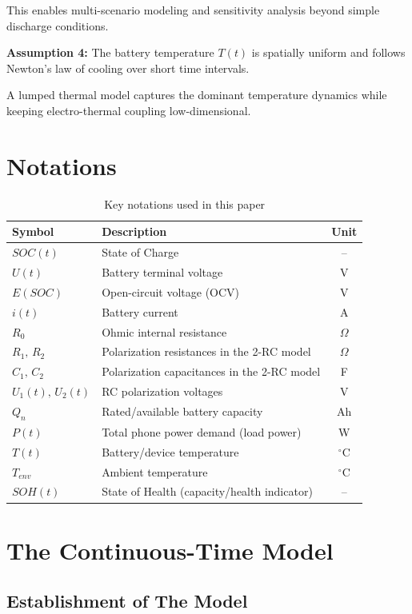 \documentclass{mcmthesis}
\begin{document}
This enables multi-scenario modeling and sensitivity analysis beyond simple discharge conditions.

\textbf{Assumption 4:}
The battery temperature $T(t)$ is spatially uniform and follows Newton’s law of cooling over short time intervals.

A lumped thermal model captures the dominant temperature dynamics while keeping electro-thermal coupling low-dimensional.
\section{Notations}

\begin{table}[H]
\centering
\caption{Key notations used in this paper}
\vspace{-0.4cm}
\begin{tabularx}{0.92\textwidth}{lXc}
\toprule
Symbol & Description & Unit \\
\midrule
$SOC(t)$ & State of Charge  & -- \\
$U(t)$ & Battery terminal voltage & V \\
$E(SOC)$ & Open-circuit voltage (OCV)  & V \\
$i(t)$ & Battery current & A \\
$R_0$ & Ohmic internal resistance & $\Omega$ \\
$R_1,\,R_2$ & Polarization resistances in the 2-RC model & $\Omega$ \\
$C_1,\,C_2$ & Polarization capacitances in the 2-RC model & F \\
$U_1(t),\,U_2(t)$ & RC polarization voltages & V \\
$Q_n$ & Rated/available battery capacity & Ah \\
$P(t)$ & Total phone power demand (load power) & W \\
$T(t)$ & Battery/device temperature & $^\circ$C \\
$T_{env}$ & Ambient temperature & $^\circ$C \\
$SOH(t)$ & State of Health (capacity/health indicator) & -- \\
\bottomrule
\end{tabularx}
\end{table}
\section{The Continuous-Time Model }
\subsection{Establishment of The Model}
\end{document}
